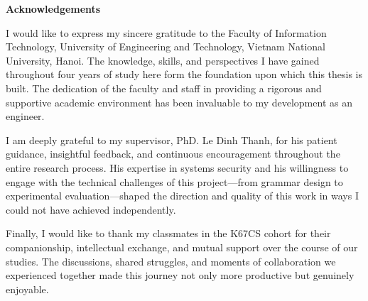 \begin{center}
\textbf{\large{Acknowledgements}}
\end{center}

I would like to express my sincere gratitude to the Faculty of Information Technology, University of Engineering and Technology, Vietnam National University, Hanoi. The knowledge, skills, and perspectives I have gained throughout four years of study here form the foundation upon which this thesis is built. The dedication of the faculty and staff in providing a rigorous and supportive academic environment has been invaluable to my development as an engineer.

I am deeply grateful to my supervisor, PhD. Le Dinh Thanh, for his patient guidance, insightful feedback, and continuous encouragement throughout the entire research process. His expertise in systems security and his willingness to engage with the technical challenges of this project—from grammar design to experimental evaluation—shaped the direction and quality of this work in ways I could not have achieved independently.

Finally, I would like to thank my classmates in the K67CS cohort for their companionship, intellectual exchange, and mutual support over the course of our studies. The discussions, shared struggles, and moments of collaboration we experienced together made this journey not only more productive but genuinely enjoyable.
